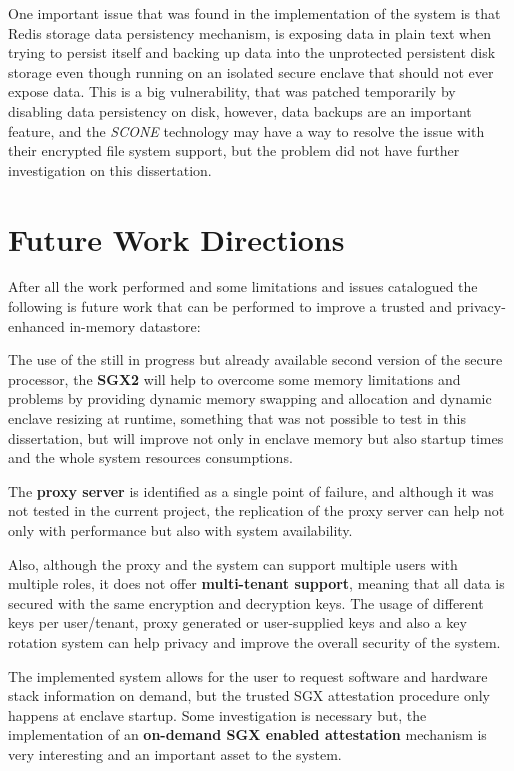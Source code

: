 One important issue that was found in the implementation of the system is that Redis storage data persistency mechanism, is exposing data in plain text when trying to persist itself and backing up data into the unprotected persistent disk storage even though running on an isolated secure enclave that should not ever expose data. This is a big vulnerability, that was patched temporarily by disabling data persistency on disk, however, data backups are an important feature, and the \textit{SCONE} technology may have a way to resolve the issue with their encrypted file system support, but the problem did not have further investigation on this dissertation.

\section{Future Work Directions}
\label{sec:future_work_directions}

After all the work performed and some limitations and issues catalogued the following is future work that can be performed to improve a trusted and privacy-enhanced in-memory datastore:

The use of the still in progress but already available second version of the secure processor, the \textbf{\gls{SGX}2} will help to overcome some memory limitations and problems by providing dynamic memory swapping and allocation and dynamic enclave resizing at runtime, something that was not possible to test in this dissertation, but will improve not only in enclave memory but also startup times and the whole system resources consumptions.

The \textbf{proxy server} is identified as a single point of failure, and although it was not tested in the current project, the replication of the proxy server can help not only with performance but also with system availability.

Also, although the proxy and the system can support multiple users with multiple roles, it does not offer \textbf{multi-tenant support}, meaning that all data is secured with the same encryption and decryption keys. The usage of different keys per user/tenant, proxy generated or user-supplied keys and also a key rotation system can help privacy and improve the overall security of the system.

The implemented system allows for the user to request software and hardware stack information on demand, but the trusted \gls{SGX} attestation procedure only happens at enclave startup. Some investigation is necessary but, the implementation of an \textbf{on-demand \gls{SGX} enabled attestation} mechanism is very interesting and an important asset to the system.

